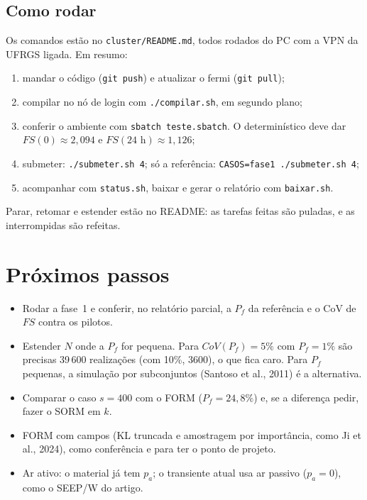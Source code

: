 \documentclass[11pt,a4paper]{article}
\begin{document}
\subsection{Como rodar}
Os comandos estão no \texttt{cluster/README.md}, todos rodados do PC com a VPN da UFRGS ligada. Em resumo:
\begin{enumerate}
\item mandar o código (\texttt{git push}) e atualizar o fermi (\texttt{git pull});
\item compilar no nó de login com \texttt{./compilar.sh}, em segundo plano;
\item conferir o ambiente com \texttt{sbatch teste.sbatch}. O determinístico deve dar $FS(0) \approx 2{,}094$ e
$FS(24\text{ h}) \approx 1{,}126$;
\item submeter: \texttt{./submeter.sh 4}; só a referência: \texttt{CASOS=fase1 ./submeter.sh 4};
\item acompanhar com \texttt{status.sh}, baixar e gerar o relatório com \texttt{baixar.sh}.
\end{enumerate}
Parar, retomar e estender estão no README: as tarefas feitas são puladas, e as interrompidas são refeitas.

\section{Próximos passos}\label{sec:proximos}
\begin{itemize}
\item Rodar a fase~1 e conferir, no relatório parcial, a $P_f$ da referência e o CoV de $FS$ contra os pilotos.
\item Estender $N$ onde a $P_f$ for pequena. Para $CoV(P_f) = 5\%$ com $P_f = 1\%$ são precisas 39\,600 realizações
(com 10\%, 3600), o que fica caro. Para $P_f$ pequenas, a simulação por subconjuntos (Santoso et al., 2011) é a
alternativa.
\item Comparar o caso $s = 400$ com o FORM ($P_f = 24{,}8\%$) e, se a diferença pedir, fazer o SORM em $k$.
\item FORM com campos (KL truncada e amostragem por importância, como Ji et al., 2024), como conferência e para ter o
ponto de projeto.
\item Ar ativo: o material já tem $p_a$; o transiente atual usa ar passivo ($p_a = 0$), como o SEEP/W do artigo.
\end{itemize}

\appendix
\end{document}

